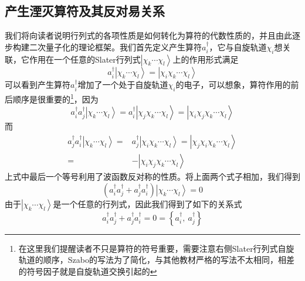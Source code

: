 \documentclass[12pt,a4paper,openany,twoside]{book}
\numberwithin{equation}{section}
\begin{document}
    \subsection{产生湮灭算符及其反对易关系} 
    我们将向读者说明行列式的各项性质是如何转化为算符的代数性质的，并且由此逐步构建二次量子化的理论框架。我们首先定义产生算符$a_i^{\dagger}$，它与自旋轨道$\chi_i$想关联，它作用在一个任意的Slater行列式$\left|\chi_k\cdots\chi_l\right\rangle$上的作用形式满足
    \begin{equation}
        a_i^{\dagger}\left|\chi_k\cdots\chi_l\right\rangle=\left|\chi_i\chi_k\cdots\chi_l\right\rangle
        \label{creation operator}
    \end{equation}
      可以看到产生算符$a_i^{\dagger}$增加了一个处于自旋轨道$\chi_i$的电子，可以想象，算符作用的前后顺序是很重要的\footnote{在这里我们提醒读者不只是算符的符号重要，需要注意右侧Slater行列式自旋轨道的顺序，Szabo的写法为了简化，与其他教材严格的写法不太相同，相差的符号因子就是自旋轨道交换引起的}，因为
      \begin{equation}
          a_i^{\dagger}a_j^{\dagger}\left|\chi_k\cdots\chi_l\right\rangle=a_i^{\dagger}
          \left|\chi_j\chi_k\cdots\chi_l\right\rangle=\left|\chi_i\chi_j\chi_k\cdots\chi_l\right\rangle
      \end{equation}
      而
      \begin{equation}
          \begin{aligned}
              a_j^{\dagger}a_i^{\dagger}\left|\chi_k\cdots\chi_l\right\rangle=&a_j^{\dagger}
              \left|\chi_i\chi_k\cdots\chi_l\right\rangle=\left|\chi_j\chi_i\chi_k\cdots\chi_l\right\rangle\\
              =&-\left|\chi_i\chi_j\chi_k\cdots\chi_l\right\rangle
          \end{aligned}
      \end{equation}
      上式中最后一个等号利用了波函数反对称的性质。将上面两个式子相加，我们得到
      \begin{equation}
          \left(a_i^{\dagger}a_j^{\dagger}+a_j^{\dagger}a_i^{\dagger}\right)
          \left|\chi_k\cdots\chi_l\right\rangle=0
      \end{equation}
      由于$\left|\chi_k\cdots\chi_l\right\rangle$是一个任意的行列式，因此我们得到了如下的关系式
      \begin{equation}
          a_i^{\dagger}a_j^{\dagger}+a_j^{\dagger}a_i^{\dagger}=0=\left\{a_i^{\dagger},\ a_j^{\dagger}\right\}
          \label{anti commutator creation}
      \end{equation}
\end{document}
